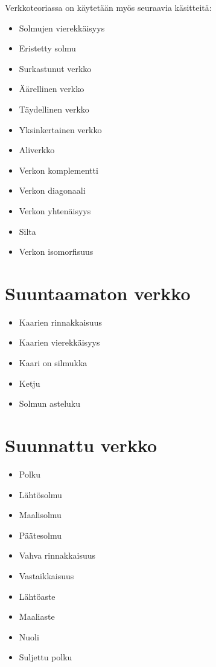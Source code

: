 Verkkoteoriassa on käytetään myös seuraavia käsitteitä:
\begin{itemize}
  \item Solmujen vierekkäisyys
  \item Eristetty solmu
  \item Surkastunut verkko
  \item Äärellinen verkko
  \item Täydellinen verkko
  \item Yksinkertainen verkko
  \item Aliverkko
  \item Verkon komplementti
  \item Verkon diagonaali
  \item Verkon yhtenäisyys
  \item Silta
  \item Verkon isomorfisuus
\end{itemize}

\section{Suuntaamaton verkko}

\begin{itemize}
  \item Kaarien rinnakkaisuus
  \item Kaarien vierekkäisyys
  \item Kaari on silmukka
  \item Ketju
  \item Solmun asteluku
\end{itemize}

\section{Suunnattu verkko}

\begin{itemize}
  \item Polku
  \item Lähtösolmu
  \item Maalisolmu
  \item Päätesolmu
  \item Vahva rinnakkaisuus
  \item Vastaikkaisuus
  \item Lähtöaste
  \item Maaliaste
  \item Nuoli
  \item Suljettu polku
\end{itemize}

